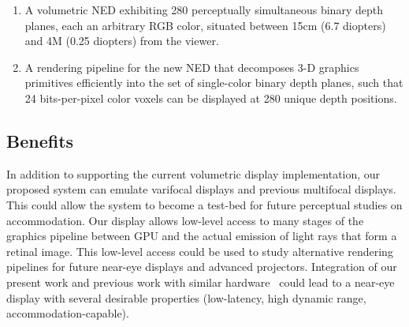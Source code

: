 \begin{enumerate}
\item A volumetric NED exhibiting 280 perceptually simultaneous binary depth planes, each an arbitrary RGB color, situated between 15cm (6.7 diopters) and 4M (0.25 diopters) from the viewer.
\item A rendering pipeline for the new NED that decomposes 3-D graphics primitives efficiently into the set of single-color binary depth planes, such that 24 bits-per-pixel color voxels can be displayed at 280 unique depth positions.
\end{enumerate}

\begin{comment}
\begin{enumerate}
\item We describe a new rendering pipeline for binary multifocal displays that allows a color voxel to be decomposed into a dense set of binary voxels in a small region around the color voxel. 
We reject the traditional notion that the color volume should be decomposed into a sparse set of color image planes, each located at a different depth. 
We analyze the losses in depth and spatial resolution that might result from the proposed decomposition and discuss mitigation methods.
\item We introduce volumetric NEDs capable of presenting high-resolution color imagery in a \emph{perceptually continuous} depth range across a large range of diopters. We demonstrate a prototype system that displays a 24-bits-per-pixel image in a binary volume composed of 280 focal planes distributed over a depth range of 15cm (6.7 diopters) to 4M (0.26.7 diopters), refreshed at 60 Hz. 
\end{enumerate}
\end{comment}

\subsection{Benefits}
\label{sec:benefits}
In addition to supporting the current volumetric display implementation, our proposed system can emulate varifocal displays and previous multifocal displays. This could allow the system to become a test-bed for future perceptual studies on accommodation. Our display allows low-level access to many stages of the graphics pipeline between GPU and the actual emission of light rays that form a retinal image. This low-level access could be used to study alternative rendering pipelines for future near-eye displays and advanced projectors. Integration of our present work and previous work with similar hardware~\cite{Lincoln2016motion,Lincoln2017scene} could lead to a near-eye display with several desirable properties (low-latency, high dynamic range, accommodation-capable). 

